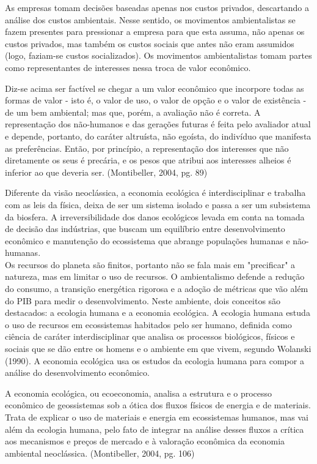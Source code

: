 \documentclass[12pt, a4paper]{article}
\newenvironment{citacao}{
  \vspace{0.5cm} %
  \small %
  \begin{list}{}{
    \leftmargin=4cm %
    \rightmargin=0cm
    \parsep=0pt
    \topsep=0pt
    \partopsep=0pt
  }
  \item\relax
  \linespread{1.0}\selectfont %
}{
  \end{list}
  \vspace{0.5cm} %
}
\begin{document}
	As empresas tomam decisões baseadas apenas nos custos privados, descartando a análise dos custos ambientais. Nesse sentido, os movimentos ambientalistas se fazem presentes para pressionar a empresa para que esta assuma, não apenas os custos privados, mas também os custos sociais que antes não eram assumidos (logo, faziam-se custos socializados). Os movimentos ambientalistas tomam partes como representantes de interesses nessa troca de valor econômico.
	\begin{citacao}
		Diz-se acima ser factível se chegar a um valor econômico que incorpore todas as formas de valor - isto é, o valor de uso, o valor de opção e o valor de existência - de um bem ambiental; mas que, porém, a avaliação não é correta. A representação dos não-humanos e das gerações futuras é feita pelo avaliador atual e depende, portanto, do caráter altruísta, não egoísta, do indivíduo que manifesta as preferências. Então, por princípio, a representação dos interesses que não diretamente os seus é precária, e os pesos que atribui aos interesses alheios é inferior ao que deveria ser. (Montibeller, 2004, pg. 89)
	\end{citacao}

	Diferente da visão neoclássica, a economia ecológica é interdisciplinar e trabalha com as leis da física, deixa de ser um sistema isolado e passa a ser um subsistema da biosfera. A irreversibilidade dos danos ecológicos levada em conta na tomada de decisão das indústrias, que buscam um equilíbrio entre desenvolvimento econômico e manutenção do ecossistema que abrange populações humanas e não-humanas.
	\\

	Os recursos do planeta são finitos, portanto não se fala mais em "precificar" a natureza, mas em limitar o uso de recursos. O ambientalismo defende a redução do consumo, a transição energética rigorosa e a adoção de métricas que vão além do PIB para medir o desenvolvimento. Neste ambiente, dois conceitos são destacados: a ecologia humana e a economia ecológica. A ecologia humana estuda o uso de recursos em ecossistemas habitados pelo ser humano, definida como ciência de caráter interdisciplinar que analisa os processos biológicos, físicos e sociais que se dão entre os homens e o ambiente em que vivem, segundo Wolanski (1990). A economia ecológica usa os estudos da ecologia humana para compor a análise do desenvolvimento econômico.
	\begin{citacao}
		A economia ecológica, ou ecoeconomia, analisa a estrutura e o processo econômico de geossistemas sob a ótica dos fluxos físicos de energia e de materiais. Trata de explicar o uso de materiais e energia em ecossistemas humanos, mas vai além da ecologia humana, pelo fato de integrar na análise desses fluxos a crítica aos mecanismos e preços de mercado e à valoração econômica da economia ambiental neoclássica. (Montibeller, 2004, pg. 106)
	\end{citacao}
\end{document}
